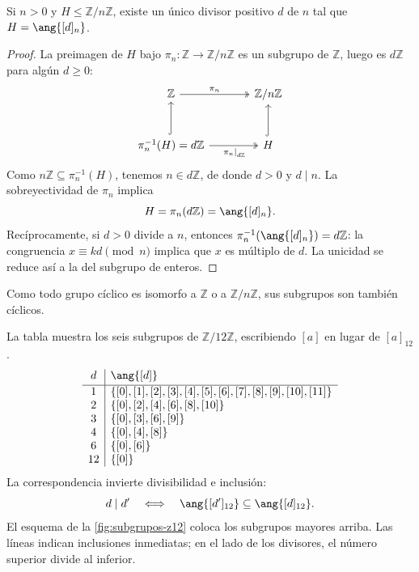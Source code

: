 \begin{prop}\label{prop:C4-subgrupos-Zn}
Si $n>0$ y $H\le\mathbb Z/n\mathbb Z$, existe un único divisor positivo $d$ de $n$ tal que $H=\ang{[d]_n}$.
\end{prop}
\begin{proof}
La preimagen de $H$ bajo $\pi_n:\mathbb Z\to\mathbb Z/n\mathbb Z$ es un subgrupo de $\mathbb Z$, luego es $d\mathbb Z$ para algún $d\ge0$:
\[
\begin{tikzcd}[column sep=large,row sep=large]
\mathbb Z\arrow[r,two heads,"\pi_n"]&\mathbb Z/n\mathbb Z\\
\pi_n^{-1}(H)=d\mathbb Z\arrow[u,hook]\arrow[r,two heads,"\restr{\pi_n}{d\mathbb Z}"']&H\arrow[u,hook]
\end{tikzcd}
\]
Como $n\mathbb Z\subseteq\pi_n^{-1}(H)$, tenemos $n\in d\mathbb Z$, de donde $d>0$ y $d\mid n$. La sobreyectividad de $\pi_n$ implica
\[
H=\pi_n(d\mathbb Z)=\ang{[d]_n}.
\]
Recíprocamente, si $d>0$ divide a $n$, entonces $\pi_n^{-1}(\ang{[d]_n})=d\mathbb Z$: la congruencia $x\equiv kd\pmod n$ implica que $x$ es múltiplo de $d$. La unicidad se reduce así a la del subgrupo de enteros.
\end{proof}
Como todo grupo cíclico es isomorfo a $\mathbb Z$ o a $\mathbb Z/n\mathbb Z$, sus subgrupos son también cíclicos.

\begin{ejem}
La tabla muestra los seis subgrupos de $\mathbb Z/12\mathbb Z$, escribiendo $[a]$ en lugar de $[a]_{12}$.
\begingroup
\renewcommand{\arraystretch}{1.2}
\[
\begin{array}{c|l}
d&\ang{[d]}\\[2pt]\hline
1&\{[0],[1],[2],[3],[4],[5],[6],[7],[8],[9],[10],[11]\}\\
2&\{[0],[2],[4],[6],[8],[10]\}\\
3&\{[0],[3],[6],[9]\}\\
4&\{[0],[4],[8]\}\\
6&\{[0],[6]\}\\
12&\{[0]\}
\end{array}
\]
\endgroup
La correspondencia invierte divisibilidad e inclusión:
\[
d\mid d'\quad\Longleftrightarrow\quad
\ang{[d']_{12}}\subseteq\ang{[d]_{12}}.
\]
El esquema de la \cref{fig:subgrupos-z12} coloca los subgrupos mayores arriba. Las líneas indican inclusiones inmediatas; en el lado de los divisores, el número superior divide al inferior.
\end{ejem}

